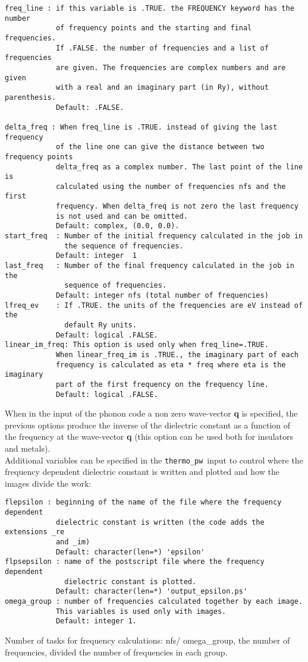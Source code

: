 \documentclass[12pt,a4paper]{article}
\def\thermo{\texttt{thermo\_pw}}
\begin{document}
\begin{verbatim}
freq_line : if this variable is .TRUE. the FREQUENCY keyword has the number 
            of frequency points and the starting and final frequencies. 
            If .FALSE. the number of frequencies and a list of frequencies 
            are given. The frequencies are complex numbers and are given 
            with a real and an imaginary part (in Ry), without parenthesis.
            Default: .FALSE.

delta_freq : When freq_line is .TRUE. instead of giving the last frequency 
            of the line one can give the distance between two frequency points
            delta_freq as a complex number. The last point of the line is 
            calculated using the number of frequencies nfs and the first 
            frequency. When delta_freq is not zero the last frequency 
            is not used and can be omitted.
            Default: complex, (0.0, 0.0).
start_freq  : Number of the initial frequency calculated in the job in
              the sequence of frequencies.
            Default: integer  1
last_freq   : Number of the final frequency calculated in the job in the
              sequence of frequencies.
            Default: integer nfs (total number of frequencies)
lfreq_ev    : If .TRUE. the units of the frequencies are eV instead of the
              default Ry units.
            Default: logical .FALSE.
linear_im_freq: This option is used only when freq_line=.TRUE. 
            When linear_freq_im is .TRUE., the imaginary part of each 
            frequency is calculated as eta * freq where eta is the imaginary 
            part of the first frequency on the frequency line.
            Default: logical .FALSE.
\end{verbatim}
When in the input of the phonon code a non zero wave-vector {\bf q}
is specified, the previous options produce the inverse of the dielectric 
constant as a function of the frequency at the wave-vector {\bf q}
(this option can be used both for insulators and metals). \\
Additional variables can be specified in the \thermo\ input to control
where the frequency dependent dielectric constant is written and plotted
and how the images divide the work:
\begin{verbatim}
flepsilon : beginning of the name of the file where the frequency dependent 
            dielectric constant is written (the code adds the extensions _re
            and _im)
            Default: character(len=*) 'epsilon'
flpsepsilon : name of the postscript file where the frequency dependent 
              dielectric constant is plotted.
            Default: character(len=*) 'output_epsilon.ps'
omega_group : number of frequencies calculated together by each image.
            This variables is used only with images.
            Default: integer 1.
\end{verbatim}
Number of tasks for frequency calculations: nfs/ omega\_group, the 
number of frequencies, divided the number of frequencies in each group.
\end{document}
